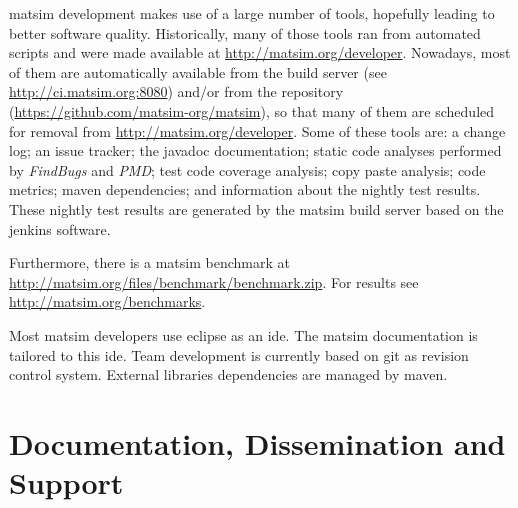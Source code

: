 \gls{matsim} development makes use of a 
large number of tools, hopefully leading to better software quality.  Historically, many of those tools ran from automated scripts and were made available at \url{http://matsim.org/developer}.  Nowadays, most of them are automatically available from the build server (see \url{http://ci.matsim.org:8080}) and/or from the repository (\url{https://github.com/matsim-org/matsim}), so that many of them are scheduled for removal from \url{http://matsim.org/developer}.  Some of these tools are:
%
a change log; an issue tracker; the \gls{javadoc} documentation; static code analyses performed by \emph{FindBugs} and \emph{PMD}; test code coverage analysis; copy paste analysis; code metrics; \gls{maven} dependencies; 
and information about the nightly test results. These nightly test results are generated by the \gls{matsim} build server based on the \gls{jenkins} software. 

Furthermore, there is a \gls{matsim} benchmark at \url{http://matsim.org/files/benchmark/benchmark.zip}. For results see \url{http://matsim.org/benchmarks}.

Most \gls{matsim} developers use \gls{eclipse} as an \gls{ide}. The \gls{matsim} documentation is tailored to this \gls{ide}. Team development is currently based on \gls{git} as revision control system. External libraries dependencies are managed by \gls{maven}.

\section{Documentation, Dissemination and Support}


